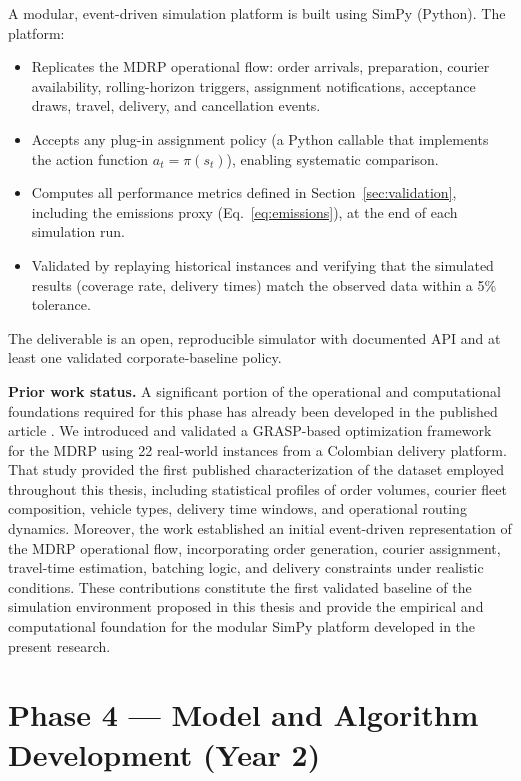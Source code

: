 \documentclass[12pt,a4paper]{report}
\begin{document}
A modular, event-driven simulation platform is built using SimPy (Python). The platform:
\begin{itemize}
    \item Replicates the MDRP operational flow: order arrivals, preparation, courier
        availability, rolling-horizon triggers, assignment notifications, acceptance draws, travel, delivery, and cancellation events.
    \item Accepts any plug-in assignment policy (a Python callable that implements the action function $a_t = \pi(s_t)$), enabling systematic comparison.
    \item Computes all performance metrics defined in Section~\ref{sec:validation}, including the emissions proxy (Eq.~\ref{eq:emissions}), at the end of each simulation run.
    \item Validated by replaying historical instances and verifying that the simulated results (coverage rate, delivery times) match the observed data within a 5\% tolerance.
\end{itemize}

\noindent The deliverable is an open, reproducible simulator with documented API and at least one validated corporate-baseline policy.

\noindent\textbf{Prior work status.} A significant portion of the operational and computational foundations required for this phase has already been developed in the published article \citet{giraldo2024grasp}. We introduced and validated a GRASP-based optimization framework for the MDRP using 22 real-world instances from a Colombian delivery platform. That study provided the first published characterization of the dataset employed throughout this thesis, including statistical profiles of order volumes, courier fleet composition, vehicle types, delivery time windows, and operational routing dynamics. Moreover, the work established an initial event-driven representation of the MDRP operational flow, incorporating order generation, courier assignment, travel-time estimation, batching logic, and delivery constraints under realistic conditions. These contributions constitute the first validated baseline of the simulation environment proposed in this thesis and provide the empirical and computational foundation for the modular SimPy platform developed in the present research.

\section{Phase 4 --- Model and Algorithm Development (Year 2)}
\label{sec:phase4}
\end{document}
